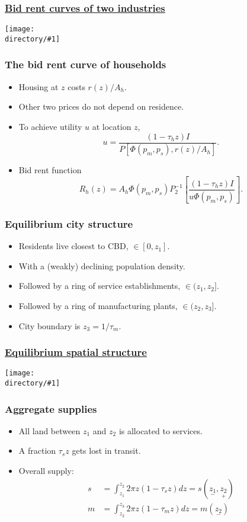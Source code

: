 \documentclass[handout,compress,mathserif]{beamer}
\newcommand{\directory}{figures}
\newcommand{\widefigure}[2]{\begin{frame}\frametitle{\hyperlink{#1back}{#2}}\hypertarget{#1}{{\begin{center}\texttt{[image: \\directory/\#1]}\end{center}}}\end{frame}}
\begin{document}
\widefigure{bid-rent-2}{Bid rent curves of two industries}

\begin{frame}\frametitle{The bid rent curve of households}
\begin{itemize}
    \item Housing at $z$ costs $r(z)/A_h$.
    \item Other two prices do not depend on residence.
    \item To achieve utility $u$ at location $z$,
    \[
    u = \frac{(1-\tau_h z) I}{P[\Phi(p_m,p_s),r(z)/A_h]}.
    \]
    \item Bid rent function
    \[
    R_h(z) = A_h\Phi(p_m,p_s)P_2^{-1}\left[\frac{(1-\tau_h z) I}{u\Phi(p_m,p_s)}\right].
    \]
\end{itemize}
\end{frame}



\begin{frame}\frametitle{Equilibrium city structure}
\begin{itemize}
    \item Residents live closest to CBD, $\in[0,z_1]$.
    \item With a (weakly) declining population density.
    \item Followed by a ring of service establishments, $\in(z_1,z_2]$.
    \item Followed by a ring of manufacturing plants, $\in(z_2,z_3]$.
    \item City boundary is $z_3 = 1/\tau_m$.
\end{itemize}
\end{frame}

\widefigure{bid-rent-3}{Equilibrium spatial structure}


\begin{frame}\frametitle{Aggregate supplies}
\begin{itemize}
    \item All land between $z_1$ and $z_2$ is allocated to services.
    \item A fraction $\tau_s z$ gets lost in transit.
    \item Overall supply:
    \begin{align*}
    s &= \int_{z_1}^{z_2}2\pi z (1-\tau_s z) dz = s(\underset{-}{z_1},\underset{+}{z_2})\\
    m &= \int_{z_2}^{z_3}2\pi z (1-\tau_m z) dz = m(\underset{-}{z_2})
    \end{align*}
\end{itemize}
\end{frame}
\end{document}
